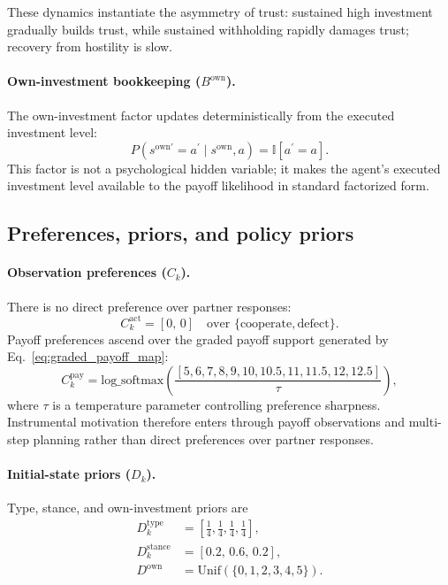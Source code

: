 These dynamics instantiate the asymmetry of trust: sustained high investment gradually builds trust, while sustained withholding rapidly damages trust; recovery from hostility is slow.

\paragraph{Own-investment bookkeeping ($B^{\mathrm{own}}$).}
The own-investment factor updates deterministically from the executed investment level:
\begin{equation}
P(s^{\mathrm{own}\prime}=a^\prime \mid s^{\mathrm{own}}, a)=\mathbb{I}[a^\prime=a].
\label{eq:b_own}
\end{equation}
This factor is not a psychological hidden variable; it makes the agent's executed investment level available to the payoff likelihood in standard factorized form.

\subsection{Preferences, priors, and policy priors}

\paragraph{Observation preferences ($C_k$).}
There is no direct preference over partner responses:
\begin{equation}
C_k^{\mathrm{act}} = [0,\,0] \quad \text{over } \{\mathrm{cooperate},\mathrm{defect}\}.
\label{eq:c_act}
\end{equation}
Payoff preferences ascend over the graded payoff support generated by Eq.~\eqref{eq:graded_payoff_map}:
\begin{equation}
C_k^{\mathrm{pay}} = \mathrm{log\_softmax}\!\left(\frac{[5,6,7,8,9,10,10.5,11,11.5,12,12.5]}{\tau}\right),
\label{eq:c_pay}
\end{equation}
where $\tau$ is a temperature parameter controlling preference sharpness. Instrumental motivation therefore enters through payoff observations and multi-step planning rather than direct preferences over partner responses.

\paragraph{Initial-state priors ($D_k$).}
Type, stance, and own-investment priors are
\begin{align}
D_k^{\mathrm{type}} &= \left[\tfrac{1}{4},\tfrac{1}{4},\tfrac{1}{4},\tfrac{1}{4}\right], \label{eq:d_type}\\
D_k^{\mathrm{stance}} &= [0.2,\,0.6,\,0.2], \label{eq:d_stance}\\
D^{\mathrm{own}} &= \mathrm{Unif}(\{0,1,2,3,4,5\}). \label{eq:d_own}
\end{align}

